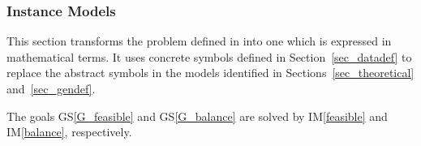 \documentclass[12pt]{article}
\newcommand{\colAwidth}{0.13\textwidth}
\newcommand{\colBwidth}{0.82\textwidth}
\newcommand{\gsref}[1]{GS\ref{#1}}
\newcommand{\iref}[1]{IM\ref{#1}}
\begin{document}






\subsubsection{Instance Models} \label{sec_instance}

This section transforms the problem defined in  into
one which is expressed in mathematical terms. It uses concrete symbols defined
in Section~\ref{sec_datadef} to replace the abstract symbols in the models
identified in Sections~\ref{sec_theoretical} and~\ref{sec_gendef}.

The goals \gsref{G_feasible} and \gsref{G_balance} are solved by \iref{feasible}
and \iref{balance}, respectively.

~\newline
\end{document}
